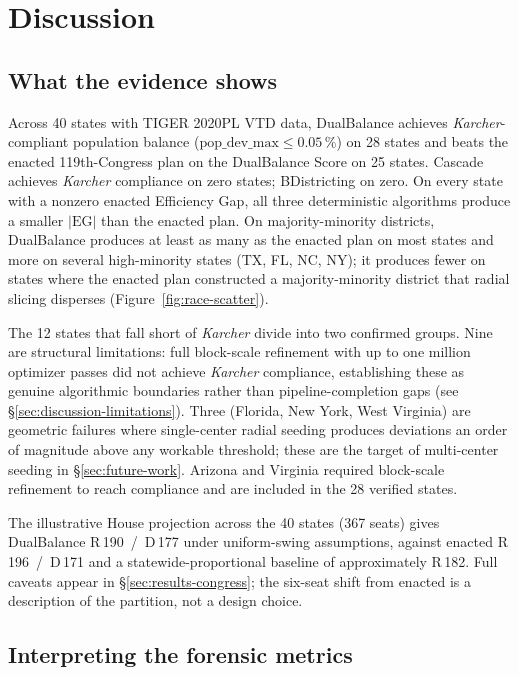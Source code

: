 ﻿\section{Discussion}
\label{sec:discussion}

\subsection{What the evidence shows}

Across 40 states with TIGER 2020PL VTD data, DualBalance achieves
\textit{Karcher}-compliant population balance ($\mathrm{pop\_dev\_max}
\leq 0.05\,\%$) on 28 states and beats the enacted 119th-Congress plan
on the DualBalance Score on 25 states. Cascade achieves \textit{Karcher}
compliance on zero states; BDistricting on zero. On every state with
a nonzero enacted Efficiency Gap, all three deterministic algorithms
produce a smaller $|\mathrm{EG}|$ than the enacted plan. On
majority-minority districts, DualBalance produces at least as many as
the enacted plan on most states and more on several high-minority
states (TX, FL, NC, NY); it produces fewer on states where the enacted
plan constructed a majority-minority district that radial slicing
disperses (Figure~\ref{fig:race-scatter}).

The 12 states that fall short of \textit{Karcher} divide into two
confirmed groups. Nine are structural limitations: full block-scale
refinement with up to one million optimizer passes did not achieve
\textit{Karcher} compliance, establishing these as genuine algorithmic
boundaries rather than pipeline-completion gaps (see
\S\ref{sec:discussion-limitations}). Three (Florida, New York, West
Virginia) are geometric failures where single-center radial seeding
produces deviations an order of magnitude above any workable threshold;
these are the target of multi-center seeding in \S\ref{sec:future-work}.
Arizona and Virginia required block-scale refinement to reach
compliance and are included in the 28 verified states.

The illustrative House projection across the 40 states (367 seats)
gives DualBalance R\,190~/~D\,177 under uniform-swing assumptions,
against enacted R\,196~/~D\,171 and a statewide-proportional baseline
of approximately R\,182. Full caveats appear in
\S\ref{sec:results-congress}; the six-seat shift from enacted is a
description of the partition, not a design choice.

\subsection{Interpreting the forensic metrics}
\label{sec:discussion-forensic}

